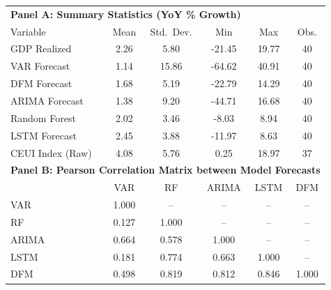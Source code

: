 \begin{tabular}{lccccc}
\toprule
\multicolumn{6}{l}{\textbf{Panel A: Summary Statistics (YoY \% Growth)}} \\
Variable & Mean & Std.\ Dev. & Min & Max & Obs. \\
\midrule
GDP Realized & 2.26 & 5.80 & -21.45 & 19.77 & 40 \\
VAR Forecast & 1.14 & 15.86 & -64.62 & 40.91 & 40 \\
DFM Forecast & 1.68 & 5.19 & -22.79 & 14.29 & 40 \\
ARIMA Forecast & 1.38 & 9.20 & -44.71 & 16.68 & 40 \\
Random Forest & 2.02 & 3.46 & -8.03 & 8.94 & 40 \\
LSTM Forecast & 2.45 & 3.88 & -11.97 & 8.63 & 40 \\
\midrule 
CEUI Index (Raw) & 4.08 & 5.76 & 0.25 & 18.97 & 37 \\
\midrule
\multicolumn{6}{l}{\textbf{Panel B: Pearson Correlation Matrix between Model Forecasts}} \\
 & VAR & RF & ARIMA & LSTM & DFM \\
\midrule
VAR & 1.000 & -- & -- & -- & -- \\
RF & 0.127 & 1.000 & -- & -- & -- \\
ARIMA & 0.664 & 0.578 & 1.000 & -- & -- \\
LSTM & 0.181 & 0.774 & 0.663 & 1.000 & -- \\
DFM & 0.498 & 0.819 & 0.812 & 0.846 & 1.000 \\
\bottomrule
\end{tabular}
